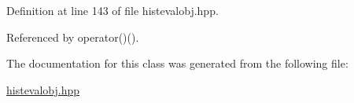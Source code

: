 \-Definition at line 143 of file histevalobj.\-hpp.



\-Referenced by operator()().



\-The documentation for this class was generated from the following file\-:\begin{DoxyCompactItemize}
\item 
\hyperlink{histevalobj_8hpp}{histevalobj.\-hpp}\end{DoxyCompactItemize}
